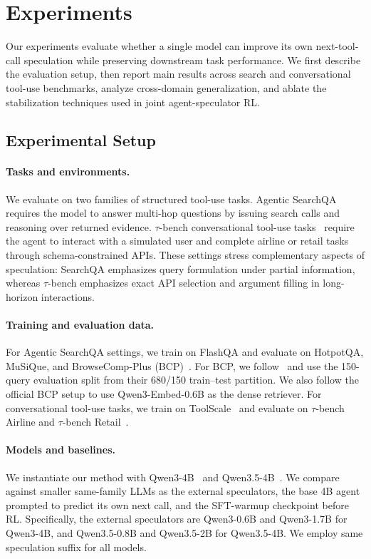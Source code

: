 \section{Experiments}
\label{sec:setup}

Our experiments evaluate whether a single model can improve its own
next-tool-call speculation while preserving downstream task performance. We
first describe the evaluation setup, then report main results across search and
conversational tool-use benchmarks, analyze cross-domain generalization, and
ablate the stabilization techniques used in joint agent-speculator RL.

\subsection{Experimental Setup}
\label{sec:experiments:setup}

\paragraph{Tasks and environments.}
We evaluate on two families of structured tool-use tasks. Agentic
SearchQA~\citep{jin2025searchr1,song2025r1searcher} requires the model to
answer multi-hop questions by issuing search calls and reasoning over returned
evidence. $\tau$-bench conversational tool-use
tasks~\citep{yao2024taubench,barres2025tau2bench} require the agent to interact
with a simulated user and complete airline or retail tasks through
schema-constrained APIs. These settings stress complementary aspects of
speculation: SearchQA emphasizes query formulation under partial information,
whereas $\tau$-bench emphasizes exact API selection and argument filling in
long-horizon interactions.

\paragraph{Training and evaluation data.}
For Agentic SearchQA settings, we train on FlashQA and evaluate on HotpotQA,
MuSiQue, and BrowseComp-Plus (BCP)~\citep{chen2025browsecompplus}.
For BCP, we follow~\citet{sun2025contextfolding} and use the 150-query evaluation split from their
680/150 train--test partition. We also follow the official BCP setup 
to use Qwen3-Embed-0.6B as the dense retriever. For
conversational tool-use tasks, we train on
ToolScale~\citep{su2025toolorchestra} and evaluate on $\tau$-bench Airline and
$\tau$-bench Retail~\citep{barres2025tau2bench}.

\paragraph{Models and baselines.}
We instantiate our method with Qwen3-4B~\citep{yang2025qwen3} and
Qwen3.5-4B~\citep{qwen2026qwen35modelcard}. We compare against smaller same-family
LLMs as the external speculators, the base 4B agent prompted to predict its own next call,
and the SFT-warmup checkpoint before RL. Specifically, the external speculators are
Qwen3-0.6B and Qwen3-1.7B for Qwen3-4B, and Qwen3.5-0.8B and Qwen3.5-2B for
Qwen3.5-4B. We employ same speculation suffix for all models. 

